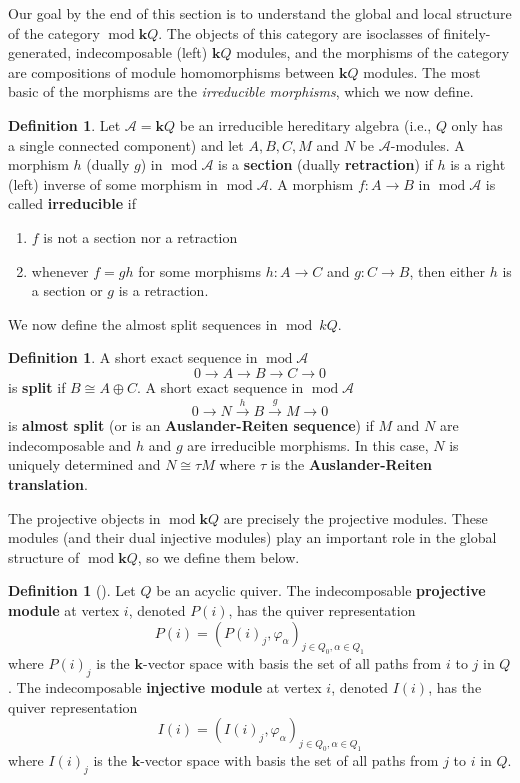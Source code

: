 \documentclass[11pt]{amsart}
\theoremstyle{plain}
\theoremstyle{definition}
\newtheorem{definition}[theorem]{Definition}
\numberwithin{equation}{section}
\renewcommand{\k}{\mathbf{k}}
\renewcommand{\mod}{\operatorname{mod}}
\begin{document}
Our goal by the end of this section is to understand the global and local structure of the category $\mod \k Q$.
The objects of this category are isoclasses of finitely-generated, indecomposable (left) $\k Q$ modules, and the morphisms of the category are compositions of module homomorphisms between $\k Q$ modules.
The most basic of the morphisms are the \textit{irreducible morphisms}, which we now define.

\begin{definition}\label{def-AR}
    Let $\mathcal{A} = \k Q$ be an irreducible hereditary algebra (i.e., $Q$ only has a single connected component) and let $A, B, C, M$ and $N$ be $\mathcal{A}$-modules.
    A morphism $h$ (dually $g$) in $\mod\mathcal{A}$ is a \textbf{section} (dually \textbf{retraction}) if $h$ is a right (left) inverse of some morphism in $\mod\mathcal{A}$.
    A morphism $f: A \to B$ in $\mod\mathcal{A}$ is called \textbf{irreducible} if
    \begin{enumerate}
        \item $f$ is not a section nor a retraction
        \item whenever $f = gh$ for some morphisms $h: A \to C$ and $g: C \to B$, then either $h$ is a section or $g$ is a retraction.
    \end{enumerate}
\end{definition}

We now define the almost split sequences in $\mod \ kQ$.

\begin{definition}
    A short exact sequence in $\mod\mathcal{A}$ $$0 \to A \to B \to C \to 0$$ is \textbf{split} if $B \cong A \oplus C$.
    A short exact sequence in $\mod\mathcal{A}$ $$0 \to N \xrightarrow{h} B \xrightarrow{g} M \to 0$$ is \textbf{almost split} (or is an \textbf{Auslander-Reiten sequence}) if $M$ and $N$ are indecomposable and $h$ and $g$ are irreducible morphisms.
    In this case, $N$ is uniquely determined and $N \cong \tau M$ where $\tau$ is the \textbf{Auslander-Reiten translation}.
\end{definition}

The projective objects in $\mod \k Q$ are precisely the projective modules. 
These modules (and their dual injective modules) play an important role in the global structure of $\mod \k Q$, so we define them below.

\begin{definition}[\cite{schiffler_quiver_2014}]
    Let $Q$ be an acyclic quiver. 
    The indecomposable \textbf{projective module} at vertex $i$, denoted $P(i)$, has the quiver representation \[ P(i) = (P(i)_j, \varphi_\alpha)_{j \in Q_0, \alpha \in Q_1} \]
    where $P(i)_j$ is the $\k$-vector space with basis the set of all paths from $i$ to $j$ in $Q$.
    The indecomposable \textbf{injective module} at vertex $i$, denoted $I(i)$, has the quiver representation \[ I(i) = (I(i)_j, \varphi_\alpha)_{j \in Q_0, \alpha \in Q_1} \]
    where $I(i)_j$ is the $\k$-vector space with basis the set of all paths from $j$ to $i$ in $Q$.
\end{definition}
\end{document}
